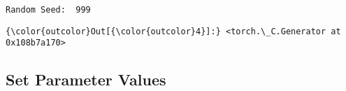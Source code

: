 \documentclass[11pt]{article}
\begin{document}
    \begin{Verbatim}[commandchars=\\\{\},fontsize=\footnotesize]
Random Seed:  999

    \end{Verbatim}

\begin{Verbatim}[commandchars=\\\{\}]
{\color{outcolor}Out[{\color{outcolor}4}]:} <torch.\_C.Generator at 0x108b7a170>
\end{Verbatim}
            
    \subsection{Set Parameter Values}\label{set-parameter-values}
\end{document}
